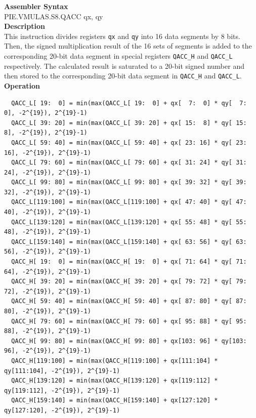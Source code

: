 \textbf{Assembler Syntax} \\
PIE.VMULAS.S8.QACC qx, qy \\
\textbf{Description} \\
This instruction divides registers \lstinline{qx} and \lstinline{qy} into 16 data segments by 8 bits. Then, the signed multiplication result of the 16 sets of segments is added to the corresponding 20-bit data segment in special registers \lstinline{QACC_H} and \lstinline{QACC_L} respectively. The calculated result is saturated to a 20-bit signed number and then stored to the corresponding 20-bit data segment in \lstinline{QACC_H} and \lstinline{QACC_L}.\\
\textbf{Operation}
\begin{lstlisting}
  QACC_L[ 19:  0] = min(max(QACC_L[ 19:  0] + qx[  7:  0] * qy[  7:  0], -2^{19}), 2^{19}-1)
  QACC_L[ 39: 20] = min(max(QACC_L[ 39: 20] + qx[ 15:  8] * qy[ 15:  8], -2^{19}), 2^{19}-1)
  QACC_L[ 59: 40] = min(max(QACC_L[ 59: 40] + qx[ 23: 16] * qy[ 23: 16], -2^{19}), 2^{19}-1)
  QACC_L[ 79: 60] = min(max(QACC_L[ 79: 60] + qx[ 31: 24] * qy[ 31: 24], -2^{19}), 2^{19}-1)
  QACC_L[ 99: 80] = min(max(QACC_L[ 99: 80] + qx[ 39: 32] * qy[ 39: 32], -2^{19}), 2^{19}-1)
  QACC_L[119:100] = min(max(QACC_L[119:100] + qx[ 47: 40] * qy[ 47: 40], -2^{19}), 2^{19}-1)
  QACC_L[139:120] = min(max(QACC_L[139:120] + qx[ 55: 48] * qy[ 55: 48], -2^{19}), 2^{19}-1)
  QACC_L[159:140] = min(max(QACC_L[159:140] + qx[ 63: 56] * qy[ 63: 56], -2^{19}), 2^{19}-1)
  QACC_H[ 19:  0] = min(max(QACC_H[ 19:  0] + qx[ 71: 64] * qy[ 71: 64], -2^{19}), 2^{19}-1)
  QACC_H[ 39: 20] = min(max(QACC_H[ 39: 20] + qx[ 79: 72] * qy[ 79: 72], -2^{19}), 2^{19}-1)
  QACC_H[ 59: 40] = min(max(QACC_H[ 59: 40] + qx[ 87: 80] * qy[ 87: 80], -2^{19}), 2^{19}-1)
  QACC_H[ 79: 60] = min(max(QACC_H[ 79: 60] + qx[ 95: 88] * qy[ 95: 88], -2^{19}), 2^{19}-1)
  QACC_H[ 99: 80] = min(max(QACC_H[ 99: 80] + qx[103: 96] * qy[103: 96], -2^{19}), 2^{19}-1)
  QACC_H[119:100] = min(max(QACC_H[119:100] + qx[111:104] * qy[111:104], -2^{19}), 2^{19}-1)
  QACC_H[139:120] = min(max(QACC_H[139:120] + qx[119:112] * qy[119:112], -2^{19}), 2^{19}-1)
  QACC_H[159:140] = min(max(QACC_H[159:140] + qx[127:120] * qy[127:120], -2^{19}), 2^{19}-1)
\end{lstlisting}

\newpage
